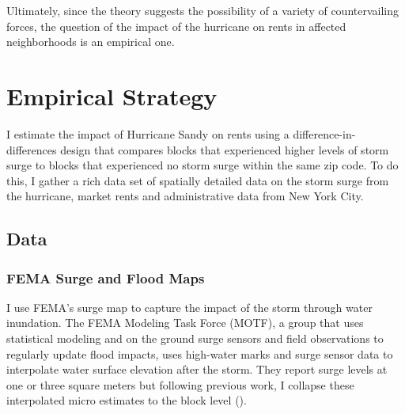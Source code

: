 \documentclass[12pt]{article}
\begin{document}
{{{Ultimately, since the theory suggests the possibility of a variety of countervailing forces, the question of the impact of the hurricane on rents in affected neighborhoods is an empirical one. 

\section{Empirical Strategy} 

I estimate the impact of Hurricane Sandy on rents using a difference-in-differences design that compares blocks that experienced higher levels of storm surge to blocks that experienced no storm surge within the same zip code. To do this, I gather a rich data set of spatially detailed data on the storm surge from the hurricane, market rents and administrative data from New York City.

\subsection{Data}{\label{sec:Data}

\subsubsection*{FEMA Surge and Flood Maps} 
I use FEMA's surge map to capture the impact of the storm through water inundation.  The FEMA Modeling Task Force (MOTF), a group that uses statistical modeling and on the ground surge sensors and field observations to regularly update flood impacts, uses high-water marks and surge sensor data to interpolate water surface elevation after the storm.  They report surge levels at one or three square meters but following previous work, I collapse these interpolated micro estimates to the block level (\cite{ellen_heterogeneity_2022}).  

}}}}
\end{document}
